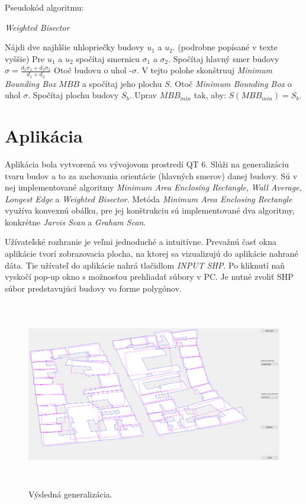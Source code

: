 \documentclass[11pt]{article}
\begin{document}
\noindent Pseudokód algoritmu:
\begin{algorithm}
    \caption {\textit{Weighted Bisector}}
    \begin{algorithmic}[1]
        \State Nájdi dve najhlšie uhlopriečky budovy $u_1$ a $u_2$. (podrobne popísané v texte vyššie)
        \State Pre $u_1$ a $u_2$ spočítaj smernicu $\sigma_1$ a $\sigma_2$.
        \State Spočítaj hlavný smer budovy $\sigma = \frac{d_1\sigma_1 + d_2\sigma_2}{d_1 + d_2}$
        \State Otoč budovu o uhol -$\sigma$.
        \State V tejto polohe skonštruuj \textit{Minimum Bounding Box} $MBB$ a spočítaj jeho plochu $S$.
        \State Otoč \textit{Minimum Bounding Box} o uhol $\sigma$.
        \State Spočítaj plochu budovy $S_b$.
        \State Uprav $MBB_{min}$ tak, aby: $S(MBB_{min}) = S_b$.
    \end{algorithmic}
\end{algorithm}

\newpage
\section{Aplikácia}
Aplikácia bola vytvorená vo vývojovom prostredí QT 6. Slúži na generalizáciu tvaru budov a to za zachovania orientácie (hlavných smerov) danej budovy. Sú v nej implementované algoritmy \textit{Minimum Area Enclosing Rectangle}, \textit{Wall Average}, \textit{Longest Edge} a \textit{Weighted Bisector}. Metóda \textit{Minimum Area Enclosing Rectangle} využíva konvexnú obálku, pre jej konštrukciu sú implementované dva algoritmy, konkrétne \textit{Jarvis Scan} a \textit{Graham Scan}.

Užívateľské rozhranie je veľmi jednoduché a intuitívne. Prevažnú časť okna aplikácie tvorí zobrazovacia plocha, na ktorej sa vizualizujú do aplikácie nahrané dáta. Tie užívateľ do aplikácie nahrá tlačidlom \textit{INPUT SHP}. Po kliknutí naň vyskočí pop-up okno s možnosťou prehliadať súbory v PC. Je nutné zvoliť SHP súbor predstavujúci budovy vo forme polygónov.

\begin{figure}[h]
\captionsetup{justification=centering}
\centering
\includegraphics[width=15.65cm, height=8.2cm]{images/aplikacia2.png}
\caption{Výsledná generalizácia.}
\label{fig:obr5}
\end{figure}
\end{document}
